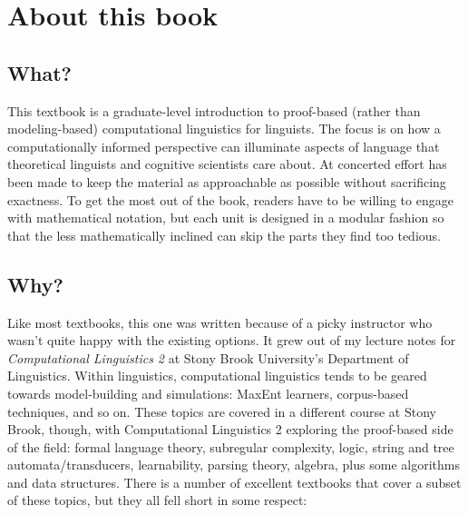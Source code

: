 \chapter*{About this book}


\section*{What?}

This textbook is a graduate-level introduction to proof-based (rather than modeling-based) computational linguistics for linguists.
The focus is on how a computationally informed perspective can illuminate aspects of language that theoretical linguists and cognitive scientists care about.
At concerted effort has been made to keep the material as approachable as possible without sacrificing exactness.
To get the most out of the book, readers have to be willing to engage with mathematical notation, but each unit is designed in a modular fashion so that the less mathematically inclined can skip the parts they find too tedious.


\section*{Why?}

Like most textbooks, this one was written because of a picky instructor who wasn't quite happy with the existing options.
It grew out of my lecture notes for \emph{Computational Linguistics 2} at Stony Brook University's Department of Linguistics.
Within linguistics, computational linguistics tends to be geared towards model-building and simulations: MaxEnt learners, corpus-based techniques, and so on.
These topics are covered in a different course at Stony Brook, though, with Computational Linguistics 2 exploring the proof-based side of the field: formal language theory, subregular complexity, logic, string and tree automata\slash transducers, learnability, parsing theory, algebra, plus some algorithms and data structures.
There is a number of excellent textbooks that cover a subset of these topics, but they all fell short in some respect:

